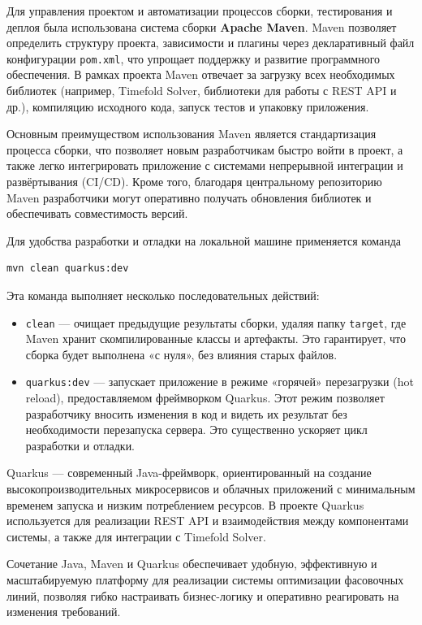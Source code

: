 Для управления проектом и автоматизации процессов сборки, тестирования и деплоя была использована система сборки \textbf{Apache Maven}. Maven позволяет определить структуру проекта, зависимости и плагины через декларативный файл конфигурации \texttt{pom.xml}, что упрощает поддержку и развитие программного обеспечения. В рамках проекта Maven отвечает за загрузку всех необходимых библиотек (например, Timefold Solver, библиотеки для работы с REST API и др.), компиляцию исходного кода, запуск тестов и упаковку приложения.

Основным преимуществом использования Maven является стандартизация процесса сборки, что позволяет новым разработчикам быстро войти в проект, а также легко интегрировать приложение с системами непрерывной интеграции и развёртывания (CI/CD). Кроме того, благодаря центральному репозиторию Maven разработчики могут оперативно получать обновления библиотек и обеспечивать совместимость версий.

Для удобства разработки и отладки на локальной машине применяется команда

\begin{verbatim}
mvn clean quarkus:dev
\end{verbatim}

Эта команда выполняет несколько последовательных действий:

\begin{itemize}
    \item \texttt{clean} — очищает предыдущие результаты сборки, удаляя папку \texttt{target}, где Maven хранит скомпилированные классы и артефакты. Это гарантирует, что сборка будет выполнена «с нуля», без влияния старых файлов.
    \item \texttt{quarkus:dev} — запускает приложение в режиме «горячей» перезагрузки (hot reload), предоставляемом фреймворком Quarkus. Этот режим позволяет разработчику вносить изменения в код и видеть их результат без необходимости перезапуска сервера. Это существенно ускоряет цикл разработки и отладки.
\end{itemize}

Quarkus — современный Java-фреймворк, ориентированный на создание высокопроизводительных микросервисов и облачных приложений с минимальным временем запуска и низким потреблением ресурсов. В проекте Quarkus используется для реализации REST API и взаимодействия между компонентами системы, а также для интеграции с Timefold Solver.

Сочетание Java, Maven и Quarkus обеспечивает удобную, эффективную и масштабируемую платформу для реализации системы оптимизации фасовочных линий, позволяя гибко настраивать бизнес-логику и оперативно реагировать на изменения требований.

